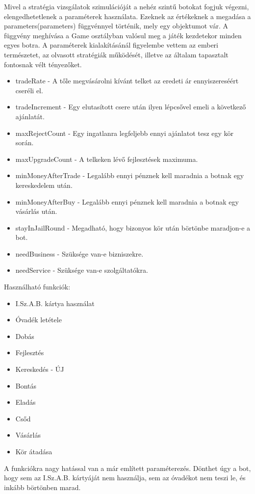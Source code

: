 Mivel a stratégia vizsgálatok szimulációját a nehéz szintű botokat fogjuk végezni, elengedhetetlenek a paraméterek használata. Ezeknek az értékeknek a megadása a parameters(parameters) függvénnyel történik, mely egy objektumot vár. A függvény meghívása a Game osztályban valósul meg a játék kezdetekor minden egyes botra. A paraméterek kialakításánál figyelembe vettem az emberi természetet, az olvasott stratégiák működését, illetve az általam tapasztalt fontosnak vélt tényezőket.

\begin{itemize}
\item tradeRate - A tőle megvásárolni kívánt telket az eredeti ár ennyiszereséért cseréli el.
\item tradeIncrement - Egy elutasított csere után ilyen lépcsővel emeli a következő ajánlatát.
\item maxRejectCount - Egy ingatlanra legfeljebb ennyi ajánlatot tesz egy kör során.
\item maxUpgradeCount - A telkeken lévő fejlesztések maximuma.
\item minMoneyAfterTrade - Legalább ennyi pénznek kell maradnia a botnak egy kereskedelem után.
\item minMoneyAfterBuy - Legalább ennyi pénznek kell maradnia a botnak egy vásárlás után.
\item stayInJailRound - Megadható, hogy bizonyos kör után börtönbe maradjon-e a bot.
\item needBusiness - Szüksége van-e bizniszekre.
\item needService - Szüksége van-e szolgáltatókra.
\end{itemize}

Használható funkciók:

\begin{itemize}
\item I.Sz.A.B. kártya használat
\item Óvadék letétele
\item Dobás
\item Fejlesztés
\item Kereskedés - ÚJ
\item Bontás
\item Eladás
\item Csőd
\item Vásárlás
\item Kör átadása
\end{itemize}

A funkciókra nagy hatással van a már említett paraméterezés. Dönthet úgy a bot, hogy sem az I.Sz.A.B. kártyáját nem használja, sem az óvadékot nem teszi le, és inkább börtönben marad.

